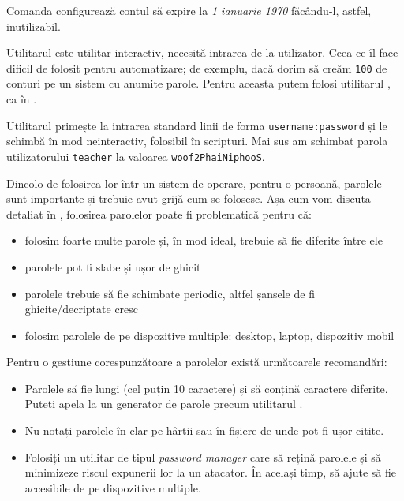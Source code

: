 Comanda configurează contul să expire la \textit{1 ianuarie 1970} făcându-l, astfel,
inutilizabil.

Utilitarul  este utilitar interactiv, necesită intrarea de la utilizator.
Ceea ce îl face dificil de folosit pentru automatizare; de exemplu, dacă dorim
să creăm \texttt{100} de conturi pe un sistem cu anumite parole. Pentru aceasta putem
folosi utilitarul , ca în .


Utilitarul  primește la intrarea standard linii de forma
\texttt{username:password} și le schimbă în mod neinteractiv, folosibil în scripturi. Mai
sus am schimbat parola utilizatorului \texttt{teacher} la valoarea \texttt{woof2PhaiNiphooS}.

Dincolo de folosirea lor într-un sistem de operare, pentru o persoană, parolele
sunt importante și trebuie avut grijă cum se folosesc. Așa cum vom discuta
detaliat în , folosirea
parolelor poate fi problematică pentru că:

\begin{itemize}
	\item folosim foarte multe parole și, în mod ideal, trebuie să fie
		diferite între ele
	\item parolele pot fi slabe și ușor de ghicit
	\item parolele trebuie să fie schimbate periodic, altfel șansele de fi
		ghicite/decriptate cresc
	\item folosim parolele de pe dispozitive multiple: desktop, laptop,
		dispozitiv mobil
\end{itemize}

Pentru o gestiune corespunzătoare a parolelor există următoarele recomandări:

\begin{itemize}
	\item Parolele să fie lungi (cel puțin 10 caractere) și să conțină
		caractere diferite. Puteți apela la un generator de parole
                precum utilitarul .
	\item Nu notați parolele în clar pe hârtii sau în fișiere de unde pot fi
		ușor citite.
        \item Folosiți un utilitar de tipul \textit{password manager} care să rețină
		parolele și să minimizeze riscul expunerii lor la un atacator.
		În același timp, să ajute să fie accesibile de pe dispozitive
		multiple.
\end{itemize}

